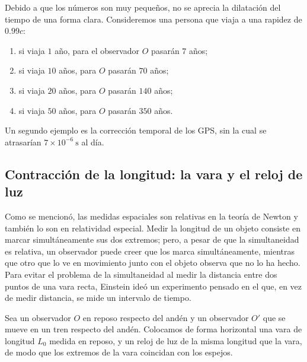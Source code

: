 \begin{ejemplo}
Debido a que los números son muy pequeños, no se aprecia la dilatación
del tiempo de una forma clara. Consideremos una persona que viaja a una
rapidez de $0.99c$:
\begin{enumerate}[label=\alph*)]
\item si viaja $1$ año, para el observador $O$ pasarán $7$ años;
\item si viaja $10$ años, para $O$ pasarán $70$ años;
\item si viaja $20$ años, para $O$ pasarán $140$ años;
\item si viaja $50$ años, para $O$ pasarán $350$ años.
\end{enumerate}
Un segundo ejemplo es la corrección temporal de los GPS, sin la cual se
atrasarían $7\times10^{-6}\ \text{s}$ al día.
\end{ejemplo}

\subsection{Contracción de la longitud: la vara y el reloj de luz}

Como se mencionó, las medidas espaciales son relativas en la teoría de
Newton y también lo son en relatividad especial. Medir la longitud de un
objeto consiste en marcar simultáneamente sus dos extremos; pero, a
pesar de que la simultaneidad es relativa, un observador puede creer que
los marca simultáneamente, mientras que otro que lo ve en movimiento
junto con el objeto observa que no lo ha hecho. Para evitar el problema
de la simultaneidad al medir la distancia entre dos puntos de una vara
recta, Einstein ideó un experimento pensado en el que, en vez de medir
distancia, se mide un intervalo de tiempo.

Sea un observador $O$ en reposo respecto del andén y un observador $O'$
que se mueve en un tren respecto del andén. Colocamos de forma
horizontal una vara de longitud $L_0$ medida en reposo, y un reloj de
luz de la misma longitud que la vara, de modo que los extremos de la
vara coincidan con los espejos.

\begin{center}
\end{center}

